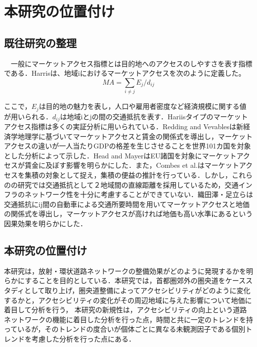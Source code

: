 \chapter{本研究の位置付け}

\section{既往研究の整理}
　一般にマーケットアクセス指標とは目的地へのアクセスのしやすさを表す指標である．Harris\cite{harrisc1954}は、地域iにおけるマーケットアクセスを次のように定義した。
\[ MA = \sum_{i \neq j}{E_{j}/d_{ij}}\]

ここで，$E_{j}$は目的地の魅力を表し，人口や雇用者密度など経済規模に関する値が用いられる．$d_{ij}$は地域iとjの間の交通抵抗を表す．Hariisタイプのマーケットアクセス指標は多くの実証分析に用いられている．Redding and Vevables\cite{redding2004}は新経済学地理学に基づいてマーケットアクセスと賃金の関係式を導出し，マーケットアクセスの違いが一人当たりGDPの格差を生じさせることを世界101カ国を対象とした分析によって示した．Head and Mayer\cite{head2006}はEU諸国を対象にマーケットアクセスが賃金に及ぼす影響を明らかにした．また，Combes et al.\cite{combes2010}はマーケットアクセスを集積の対象として捉え，集積の便益の推計を行っている．しかし，これらのの研究では交通抵抗として２地域間の直線距離を採用しているため，交通インフラのネットワーク性を十分に考慮することができていない．織田澤・足立ら\cite{otazawa2022}は交通抵抗にij間の自動車による交通所要時間を用いてマーケットアクセスと地価の関係式を導出し，マーケットアクセスが高ければ地価も高い水準にあるという因果効果を明らかにした．
 
\section{本研究の位置付け}
本研究は，放射・環状道路ネットワークの整備効果がどのように発現するかを明らかにすることを目的としている．本研究では，首都圏郊外の圏央道をケーススタディとして取り上げ，圏央道整備によってアクセシビリティがどのように変化するかと，アクセシビリティの変化がその周辺地域に与えた影響について地価に着目して分析を行う，
本研究の新規性は，アクセシビリティの向上という道路ネットワークの機能に着目した分析を行った点，時間と共に一定のトレンドを持っているが，そのトレンドの度合いが個体ごとに異なる未観測因子である個別トレンドを考慮した分析を行った点にある．